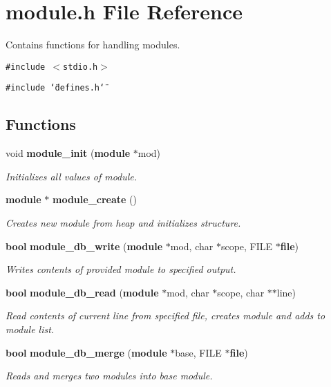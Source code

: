 \section{module.h File Reference}
\label{module_8h}
Contains functions for handling modules. 


{\tt \#include $<$stdio.h$>$}\par
{\tt \#include \char`\"{}defines.h\char`\"{}}\par
\subsection*{Functions}
\begin{CompactItemize}
\item 
void {\bf module\_\-init} ({\bf module} $\ast$mod)
\begin{CompactList}\small\item\em Initializes all values of module.\item\end{CompactList}\item 
{\bf module} $\ast$ {\bf module\_\-create} ()
\begin{CompactList}\small\item\em Creates new module from heap and initializes structure.\item\end{CompactList}\item 
{\bf bool} {\bf module\_\-db\_\-write} ({\bf module} $\ast$mod, char $\ast$scope, FILE $\ast${\bf file})
\begin{CompactList}\small\item\em Writes contents of provided module to specified output.\item\end{CompactList}\item 
{\bf bool} {\bf module\_\-db\_\-read} ({\bf module} $\ast$mod, char $\ast$scope, char $\ast$$\ast$line)
\begin{CompactList}\small\item\em Read contents of current line from specified file, creates module and adds to module list.\item\end{CompactList}\item 
{\bf bool} {\bf module\_\-db\_\-merge} ({\bf module} $\ast$base, FILE $\ast${\bf file})
\begin{CompactList}\small\item\em Reads and merges two modules into base module.\item\end{CompactList}\item 
$$
\end{CompactItemize}
